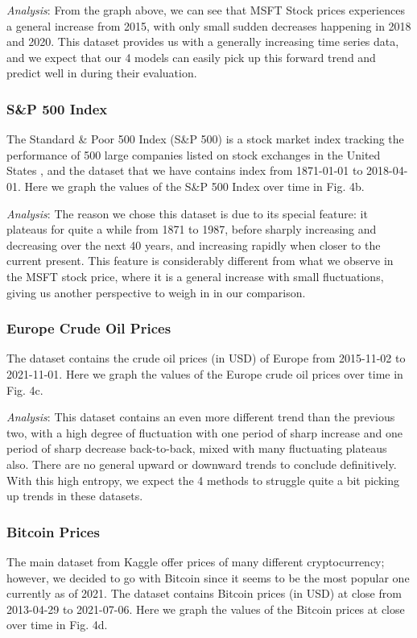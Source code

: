 \documentclass[letterpaper, 10 pt, conference]{ieeeconf}  %
\begin{document}
        \textit{Analysis}: From the graph above, we can see that MSFT Stock prices experiences a general increase from 2015, with only small sudden decreases happening in 2018 and 2020. This dataset provides us with a generally increasing time series data, and we expect that our 4 models can easily pick up this forward trend and predict well in during their evaluation. 

        \subsubsection{S\&P 500 Index} The Standard \& Poor 500 Index (S\&P 500) is a stock market index tracking the performance of 500 large companies listed on stock exchanges in the United States \cite{enwiki:1059073528}, and the dataset that we have contains index from 1871-01-01 to 2018-04-01. Here we graph the values of the S\&P 500 Index over time in Fig. 4b.

        \textit{Analysis}: The reason we chose this dataset is due to its special feature: it plateaus for quite a while from 1871 to 1987, before sharply increasing and decreasing over the next 40 years, and increasing rapidly when closer to the current present. This feature is considerably different from what we observe in the MSFT stock price, where it is a general increase with small fluctuations, giving us another perspective to weigh in in our comparison.

        \subsubsection{Europe Crude Oil Prices} The dataset contains the crude oil prices (in USD) of Europe from 2015-11-02 to 2021-11-01. Here we graph the values of the Europe crude oil prices over time in Fig. 4c.

        \textit{Analysis}: This dataset contains an even more different trend than the previous two, with a high degree of fluctuation with one period of sharp increase and one period of sharp decrease back-to-back, mixed with many fluctuating plateaus also. There are no general upward or downward trends to conclude definitively. With this high entropy, we expect the 4 methods to struggle quite a bit picking up trends in these datasets. 

        \subsubsection{Bitcoin Prices} The main dataset from Kaggle offer prices of many different cryptocurrency; however, we decided to go with Bitcoin since it seems to be the most popular one currently as of 2021. The dataset contains Bitcoin prices (in USD) at close from 2013-04-29 to 2021-07-06. Here we graph the values of the Bitcoin prices at close over time in Fig. 4d.
\end{document}
